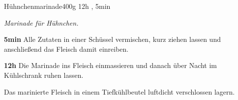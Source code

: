 \documentclass[../recipe-collections/cooking.tex]{subfiles}
\begin{document}
\begin{recipe}{Hühnchenmarinade}{400g }{12h , 5min }

  \freeform{}\textit{Marinade für Hühnchen.}


  \textbf{5min}
  Alle Zutaten in einer Schüssel vermischen, kurz ziehen lassen und anschließend das Fleisch damit einreiben.

  \newstep{}\textbf{12h}
  Die Marinade ins Fleisch einmassieren und danach über Nacht im Kühlschrank ruhen lassen.

  \freeform{}\hrulefill{}

  \freeform{}
  Das marinierte Fleisch in einem Tiefkühlbeutel luftdicht verschlossen lagern.

\end{recipe}
\end{document}
